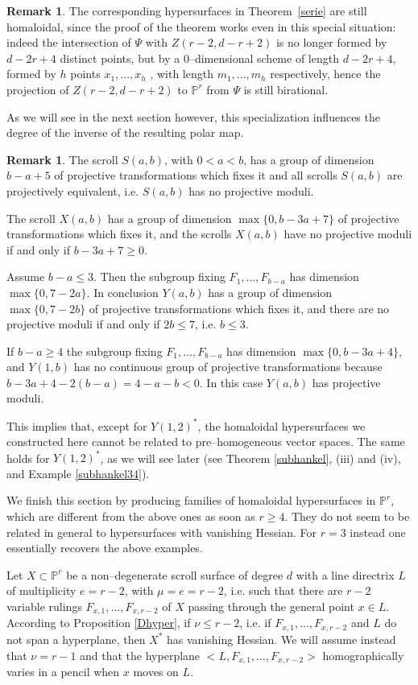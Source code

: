 \documentclass[11pt]{article}   %
\theoremstyle{definition}
\newtheorem{Remark}[Theorem]{Remark}
\numberwithin{Theorem}{section} \numberwithin{equation}{section}
\newcommand{\p}{{\mathbb P}}
\begin{document}
{\begin{Remark}
The corresponding hypersurfaces in Theorem~\ref{serie} are still
homaloidal, since the proof of the theorem works even in this
special situation: indeed the intersection of $\Psi$ with
$Z(r-2,d-r+2)$ is no longer formed by $d-2r+4$ distinct points, but
by a $0$--dimensional scheme of length $d-2r+4$, formed by $h$
points $x_1,...,x_h$ , with length $m_1,...,m_h$ respectively, hence
the projection of $Z(r-2,d-r+2)$  to $\p^ r$ from $\Psi$ is still
birational.

As we will see in the next section however, this specialization influences
the degree of the inverse of the resulting polar map.\end{Remark}


\begin{Remark}\label{moduli}\rm The scroll $S(a,b)$, with $0<a<b$, has a
group of dimension $b-a+5$ of projective transformations which fixes
it and all scrolls $S(a,b)$ are projectively equivalent, i.e.
$S(a,b)$ has no projective moduli.

The scroll $X(a,b)$ has a group of dimension
$\max\{0,b-3a+7\}$ of projective transformations which fixes it,
and the scrolls $X(a,b)$ have no projective moduli if and only
if $b-3a+7\geq 0$.

Assume $b-a\leq 3$. Then
the subgroup fixing $F_1,...,F_{b-a}$ has
dimension $\max\{0,7-2a\}$. In conclusion $Y(a,b)$ has a group of
dimension $\max\{0,7-2b\}$ of projective transformations which
fixes it, and there are no projective moduli if and only if
$2b\leq 7$, i.e. $b\leq 3$.

If $b-a\geq 4$ the subgroup fixing $F_1,...,F_{b-a}$ has
dimension $\max\{0,b-3a+4\}$, and $Y(1,b)$ has no continuous
group of projective transformations because
$b-3a+4-2(b-a)=4-a-b<0$. In this case $Y(a,b)$
has projective moduli.

This implies that, except for $Y(1,2)^*$, the
homaloidal hypersurfaces we constructed here cannot be related to
pre--homogeneous vector spaces. The same holds for $Y(1,2)^*$,
as we will see later (see Theorem \ref {subhankel}, (iii) and (iv), and Example \ref {subhankel34}).
\end{Remark}

We finish this section by producing families of homaloidal
hypersurfaces in $\p^ r$, which are different from the above ones
as soon as $r\geq 4$.  They do not seem to be related in general
to hypersurfaces with vanishing Hessian. For $r=3$ instead one
essentially recovers the above examples.

Let $X\subset \p^ r$ be a non--degenerate scroll surface of degree
$d$ with a line directrix $L$ of multiplicity $e=r-2$, with $\mu=e=r-2$,
i.e. such that there are $r-2$ variable rulings $F_{x,1},\dots, F_{x,r-2}$ of
$X$ passing through the general point $x\in L$. According to Proposition
\ref {Dhyper}, if $\nu\leq r-2$, i.e. if $F_{x,1},\dots, F_{x,r-2}$ and $L$ do not span a
hyperplane, then $X^ *$ has vanishing Hessian. We will assume instead
that $\nu=r-1$ and that the hyperplane $<L,F_{x,1},\dots, F_{x,r-2}>$
homographically varies in a pencil when $x$ moves on $L$.

}
\end{document}
